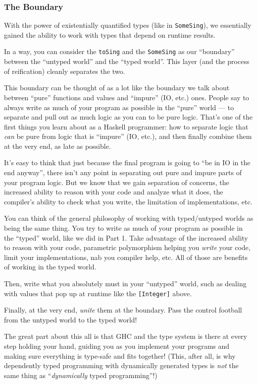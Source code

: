 \documentclass[]{article}
\begin{document}
\subsubsection{The Boundary}\label{the-boundary}

With the power of existentially quantified types (like in \texttt{SomeSing}), we
essentially gained the ability to work with types that depend on runtime
results.

In a way, you can consider the \texttt{toSing} and the \texttt{SomeSing} as our
``boundary'' between the ``untyped world'' and the ``typed world''. This layer
(and the process of reification) cleanly separates the two.

This boundary can be thought of as a lot like the boundary we talk about between
``pure'' functions and values and ``impure'' (IO, etc.) ones. People say to
always write as much of your program as possible in the ``pure'' world --- to
separate and pull out as much logic as you can to be pure logic. That's one of
the first things you learn about as a Haskell programmer: how to separate logic
that \emph{can} be pure from logic that is ``impure'' (IO, etc.), and then
finally combine them at the very end, as late as possible.

It's easy to think that just because the final program is going to ``be in IO in
the end anyway'', there isn't any point in separating out pure and impure parts
of your program logic. But we know that we gain separation of concerns, the
increased ability to reason with your code and analyze what it does, the
compiler's ability to check what you write, the limitation of implementations,
etc.

You can think of the general philosophy of working with typed/untyped worlds as
being the same thing. You try to write as much of your program as possible in
the ``typed'' world, like we did in Part 1. Take advantage of the increased
ability to reason with your code, parametric polymorphism helping you
\emph{write} your code, limit your implementations, nab you compiler help, etc.
All of those are benefits of working in the typed world.

Then, write what you absolutely must in your ``untyped'' world, such as dealing
with values that pop up at runtime like the \texttt{{[}Integer{]}} above.

Finally, at the very end, \emph{unite} them at the boundary. Pass the control
football from the untyped world to the typed world!

The great part about this all is that GHC and the type system is there at every
step holding your hand, guiding you as you implement your programs and making
sure everything is type-safe and fits together! (This, after all, is why
dependently typed programming with dynamically generated types is \emph{not} the
same thing as ``\emph{dynamically} typed programming''!)
\end{document}
